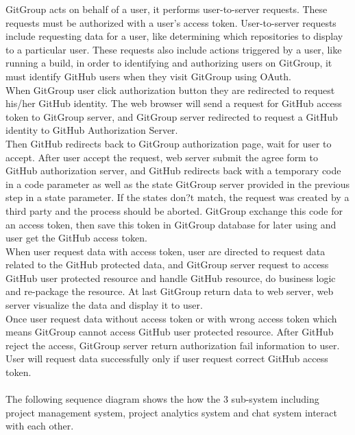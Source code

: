 \documentclass[12pt,a4paper]{report}
\begin{document}
GitGroup acts on behalf of a user, it performs user-to-server requests. These requests must be authorized with a user's access token. User-to-server requests include requesting data for a user, like determining which repositories to display to a particular user. These requests also include actions triggered by a user, like running a build, in order to identifying and authorizing users on GitGroup, it must identify GitHub users when they visit GitGroup using OAuth.\\
When GitGroup user click authorization button they are redirected to request his/her GitHub identity. The web browser will send a request for GitHub access token to GitGroup server, and GitGroup server redirected to request a GitHub identity to GitHub Authorization Server. \\
Then GitHub redirects back to GitGroup authorization page, wait for user to accept. After user accept the request, web server submit the agree form to GitHub authorization server, and GitHub redirects back with a temporary code in a code parameter as well as the state GitGroup server provided in the previous step in a state parameter. If the states don?t match, the request was created by a third party and the process should be aborted. GitGroup exchange this code for an access token, then save this token in GitGroup database for later using and user get the GitHub access token. \\
When user request data with access token, user are directed to request data related to the GitHub protected data, and GitGroup server request to access GitHub user protected resource and handle GitHub resource, do business logic and re-package the resource. At last GitGroup return data to web server, web server visualize the data and display it to user.\\
Once user request data without access token or with wrong access token which means GitGroup cannot access GitHub user protected resource. After GitHub reject the access, GitGroup server return authorization fail information to user. User will request data successfully only if user request correct GitHub access token.\\
\\
The following sequence diagram shows the how the 3 sub-system including project management system, project analytics system and chat system interact with each other.
\end{document}
